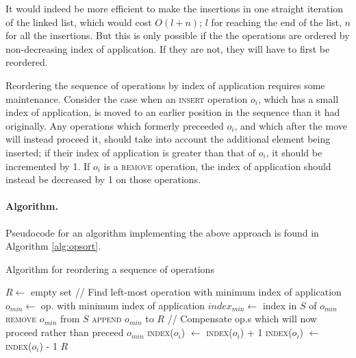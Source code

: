 It would indeed be more efficient to make the insertions in one straight
iteration of the linked list, which would cost $O(l+n)$; $l$ for reaching the
end of the list, $n$ for all the insertions. But this is only possible if the
the operations are ordered by non-decreasing index of application. If they are
not, they will have to first be reordered.

Reordering the sequence of operations by index of application requires some
maintenance. Consider the case when an \textsc{insert} operation $o_i$, which
has a small index of application, is moved to an earlier position in the
sequence than it had originally. Any operations which formerly preceeded $o_i$,
and which after the move will instead proceed it, should take into account the
additional element being inserted; if their index of application is greater than
that of $o_i$, it should be incremented by 1. If $o_i$ is a \textsc{remove}
operation, the index of application should instead be decreased by 1 on those
operations.

\paragraph{Algorithm.} Pseudocode for an algorithm implementing the above
approach is found in Algorithm \ref{alg:opsort}.

\begin{algorithm}[!ht]
  \caption{Algorithm for reordering a sequence of operations}
  \label{alg:opsort}
  \begin{algorithmic}[5]
      \State $R \gets$ empty set
        \State // Find left-most operation with minimum index of application
        \State $o_{min} \gets$ op. with minimum index of application
        \State $index_{min} \gets$ index in $S$ of $o_{min}$
        \State \textsc{remove} $o_{min}$ from $S$
        \State \textsc{append} $o_{min}$ to $R$
        \Statex
        \State // Compensate op.s which will now proceed rather than
        preceed $o_{min}$
            \State \textsc{index}($o_i$) $\gets$ \textsc{index}($o_i$) + 1
          \EndFor
            \State \textsc{index}($o_i$) $\gets$ \textsc{index}($o_i$) - 1
          \EndFor
        \EndIf
       \EndWhile
      \Statex
      \State \Return $R$
    \EndFunction
  \end{algorithmic}
\end{algorithm}

